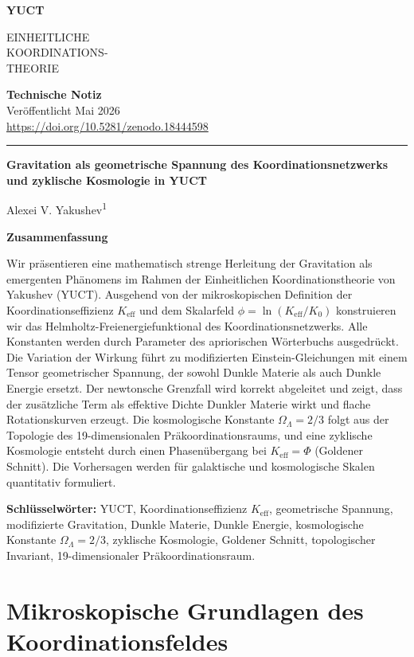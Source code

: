\documentclass[12pt,a4paper]{article}
\newcommand{\makeheader}{%
	\noindent
	\begin{minipage}{0.17\textwidth}
		\raggedright
		{\sffamily\bfseries\color{skyblue}\fontsize{46}{46}\selectfont YUCT}%
	\end{minipage}%
	\hspace{30pt}
	\begin{minipage}{0.32\textwidth}
		\raggedright
		{\sffamily\fontsize{11}{13}\selectfont EINHEITLICHE\\ KOORDINATIONS-\\ THEORIE}%
	\end{minipage}%
	\hfill
	\begin{minipage}{0.38\textwidth}
		\raggedleft
		{\sffamily\bfseries Technische Notiz}\\ 
		{\sffamily Veröffentlicht Mai 2026}\\ 
		{\sffamily\footnotesize \scriptsize\url{https://doi.org/10.5281/zenodo.18444598}}%
	\end{minipage}
	\par\vspace{5pt}
	\noindent\textcolor{gold}{\rule{\textwidth}{1.6pt}}
	\par\vspace{0pt}
}
\begin{document}
	\thispagestyle{firstpage}
	\newpage
	\makeheader
	
	\vspace{0cm}
	{\LARGE\bfseries Gravitation als geometrische Spannung des Koordinationsnetzwerks und zyklische Kosmologie in YUCT \par}
	\vspace{0.2cm}
	
	{\large Alexei V. Yakushev\textsuperscript{1}} \\
	\vspace{0.0cm}
	
	{\color{darkblue}\textbf{\LARGE Zusammenfassung}} \par
	{\large
		\noindent
		Wir präsentieren eine mathematisch strenge Herleitung der Gravitation als emergenten Phänomens im Rahmen der Einheitlichen Koordinationstheorie von Yakushev (YUCT). Ausgehend von der mikroskopischen Definition der Koordinationseffizienz \(K_{\mathrm{eff}}\) und dem Skalarfeld \(\phi = \ln (K_{\mathrm{eff}}/K_0)\) konstruieren wir das Helmholtz-Freienergiefunktional des Koordinationsnetzwerks. Alle Konstanten werden durch Parameter des apriorischen Wörterbuchs ausgedrückt. Die Variation der Wirkung führt zu modifizierten Einstein-Gleichungen mit einem Tensor geometrischer Spannung, der sowohl Dunkle Materie als auch Dunkle Energie ersetzt. Der newtonsche Grenzfall wird korrekt abgeleitet und zeigt, dass der zusätzliche Term als effektive Dichte Dunkler Materie wirkt und flache Rotationskurven erzeugt. Die kosmologische Konstante \(\Omega_\Lambda = 2/3\) folgt aus der Topologie des 19-dimensionalen Präkoordinationsraums, und eine zyklische Kosmologie entsteht durch einen Phasenübergang bei \(K_{\mathrm{eff}} = \Phi\) (Goldener Schnitt). Die Vorhersagen werden für galaktische und kosmologische Skalen quantitativ formuliert.
	}
	
	\vspace{0.1cm}
	\noindent
	{\color{darkblue}\textbf{Schlüsselwörter:}} YUCT, Koordinationseffizienz \(K_{\mathrm{eff}}\), geometrische Spannung, modifizierte Gravitation, Dunkle Materie, Dunkle Energie, kosmologische Konstante \(\Omega_\Lambda=2/3\), zyklische Kosmologie, Goldener Schnitt, topologischer Invariant, 19-dimensionaler Präkoordinationsraum.
	
	\vspace{0.4cm}
	
	\tableofcontents
	
	\section{Mikroskopische Grundlagen des Koordinationsfeldes}
	
\end{document}
